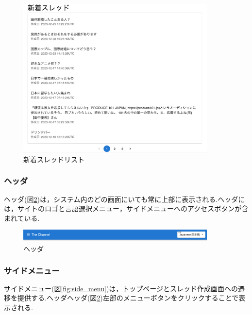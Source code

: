 \documentclass[b5paper,12pt,dvipdfmx]{jsreport}
\begin{document}
\begin{figure}[H]
	\centering
    \includegraphics[width=100mm,height=81.00mm]{./img/feature/new_thread_list.png}
	\caption{新着スレッドリスト}
	\label{fig:new_thread_list}
\end{figure}

\subsubsection{ヘッダ}
ヘッダ(図\ref{fig:header})は，システム内のどの画面にいても常に上部に表示される.ヘッダには，サイトのロゴと言語選択メニュー，サイドメニューへのアクセスボタンが含まれている.

\begin{figure}[H]
	\centering
    \includegraphics[width=100mm,height=6.66mm]{./img/feature/header.png}
	\caption{ヘッダ}
	\label{fig:header}
\end{figure}


\subsubsection{サイドメニュー}
サイドメニュー(図\ref{fig:side_menu})は，トップページとスレッド作成画面への遷移を提供する.ヘッダヘッダ(図\ref{fig:header})左部のメニューボタンをクリックすることで表示される.
\end{document}
